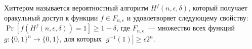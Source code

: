Хиттером называется вероятностный алгоритм $H^f(n, \epsilon, \delta)$, который получает оракульный доступ к функции $f \in
F_{n, \epsilon}$ и удовлетворяет следующему свойству: $\Pr[f(H^f(n, \epsilon, \delta)) = 1] \ge 1 - \delta$, где
$F_{n, \epsilon}$~--- множество всех функций $g: \{0, 1\}^n \to \{0, 1\}$, для которых $|g^{-1}(1)| \ge \epsilon 2^n$.